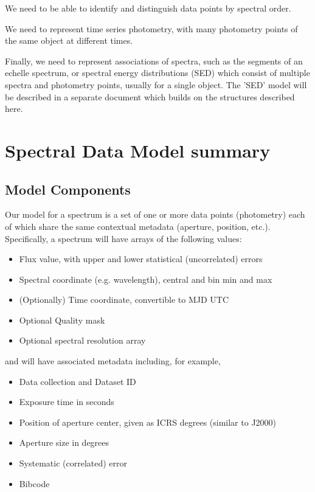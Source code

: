 \documentclass[11pt]{article}
\begin{document}
We need to be able to identify and distinguish data points by spectral order.

We need to represent time series photometry, with many photometry points
of the same object at different times.

Finally, we need to represent associations of spectra,
such as the segments of an echelle spectrum, or
spectral energy distributions (SED) which
consist of multiple spectra and photometry points, usually for a single
object. The 'SED' model will be described in
a separate document which builds on the structures described here.


\section{Spectral Data Model summary}

\subsection{Model Components}

Our model for a spectrum is a set of one or more data points (photometry)  each of
which share the same contextual metadata  (aperture, position,
etc.). Specifically, a spectrum
will have arrays of the following values:

\vskip 0.1in

\colorbox{ipink}{
\begin{minipage}{0.9\textwidth}

\begin{itemize}
\item Flux value, with upper and lower statistical (uncorrelated) errors 
\item Spectral coordinate  (e.g. wavelength), central and bin min and max 
\item (Optionally) Time coordinate, convertible to MJD UTC
\item Optional Quality mask
\item Optional spectral resolution array
\end{itemize}
\end{minipage}
}

\vskip 0.1in

and will have associated metadata including, for example,

\vskip 0.1in

\colorbox{ipink}{
\begin{minipage}{0.9\textwidth}
\begin{itemize}
\item Data collection and Dataset ID
\item Exposure time in seconds
\item Position of aperture center, given as ICRS degrees
(similar to J2000)
\item Aperture size in degrees
\item Systematic (correlated) error
\item Bibcode
\end{itemize}
\end{minipage}
}
\end{document}
